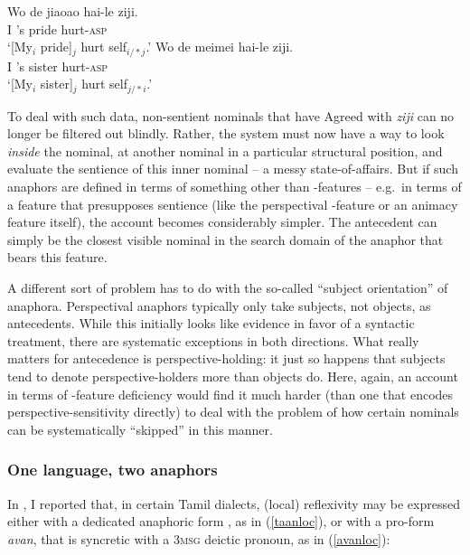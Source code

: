 \documentclass[output=paper, modfonts, nonflat]{langsci/langscibook}
\begin{document}
 \ea\label{sub}\gll Wo de jiaoao hai-le ziji.\\
 I 's pride hurt-{\scshape asp} \anaph\\
 \glt `[My$_i$ pride]$_j$ hurt self$_{i/*j}$.'
 \ex\label{nosub}\gll Wo de meimei hai-le ziji.\\
 I 's sister hurt-{\scshape asp} \anaph\\
 \glt `[My$_i$ sister]$_j$ hurt self$_{j/*i}$.'  \z

 \noindent To deal with such data, non-sentient nominals that have Agreed with
 \textit{ziji} can no longer be filtered out blindly.  Rather, the
 system must now have a way to look \emph{inside} the nominal, at
 another nominal in a particular structural position, and evaluate the
 sentience of this inner nominal -- a messy state-of-affairs. But if
 such anaphors are defined in terms of something other than \ph-features{}
 -- e.g.\ in terms of a feature that presupposes sentience (like the
 perspectival \dep-feature or an animacy feature itself), the
 account becomes considerably simpler. The antecedent can simply be
 the closest visible nominal in the search domain of the anaphor that
 bears this feature.%

 A different sort of problem has to do with the so-called ``subject
 orientation'' of anaphora. Perspectival anaphors typically only take
 subjects, not objects, as antecedents. While this initially looks
 like evidence in favor of a syntactic treatment, there are systematic
 exceptions in both directions. What really matters for antecedence is
 perspective-holding: it just so happens that subjects tend to
 denote perspective-holders more than objects do. Here, again, an
 account in terms of \ph-feature deficiency would find it much harder
 (than one that encodes perspective-sensitivity directly) to deal with
 the problem of how certain nominals can be systematically ``skipped''
 in this manner.



\subsubsection{One language, two anaphors}


In \citet[85, 84a--b]{sundaresan:2012}, I reported that, in
certain Tamil dialects, (local) reflexivity may be expressed either
with a dedicated anaphoric form \taan, as in (\ref{taanloc}), or with
a pro-form \textit{avan}, that is syncretic with a \textsc{3msg}
deictic pronoun, as in (\ref{avanloc}):
\end{document}

